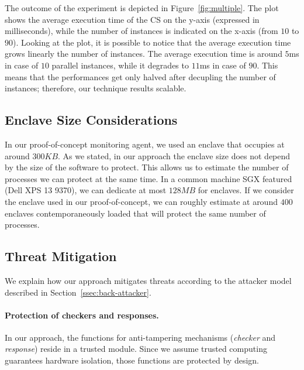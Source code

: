 The outcome of the experiment is depicted in Figure~\ref{fig:multiple}.
The plot shows the average execution time of the CS on the y-axis (expressed in 
milliseconds), while 
the number of instances is indicated on the x-axis (from $10$ to $90$).
Looking at the plot, it is possible to notice that the average execution time 
grows linearly \wrt the number of instances.
The average execution time is around $5$ms in case of $10$ parallel instances, 
while it degrades to $11$ms in case of $90$. 
This means that the performances get only halved after decupling the number of 
instances; therefore, our technique results scalable.

\subsection{Enclave Size Considerations}
In our proof-of-concept monitoring agent, we used an enclave that occupies at 
around $300KB$.
As we stated, in our approach the enclave size does not depend by the size of 
the software to protect.
This allows us to estimate the number of processes we can protect at the same 
time.
In a common machine SGX featured (\eg Dell XPS 13 9370), we can dedicate at 
most $128MB$ for enclaves.
If we consider the enclave used in our proof-of-concept, we can roughly 
estimate at around $400$ enclaves contemporaneously loaded that will protect 
the same number of processes.

\subsection{Threat Mitigation}
We explain how our approach mitigates threats according to the attacker model 
described in Section~\ref{ssec:back-attacker}.

\paragraph{\textbf{Protection of checkers and responses.}} In our approach, the 
functions for anti-tampering mechanisms (\eg \emph{checker} and 
\emph{response}) reside in a trusted module. Since we assume trusted computing 
guarantees hardware isolation, those functions are protected by design.


